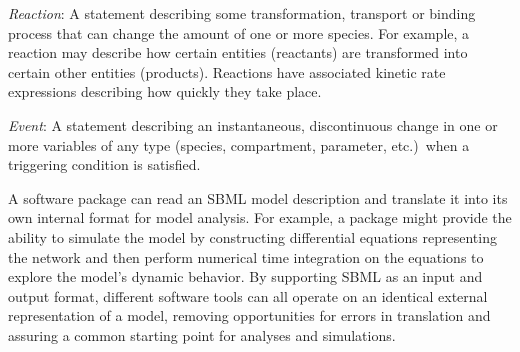 \begin{description}
\item \emph{Reaction}: A statement describing some transformation,
  transport or binding process that can change the amount of one
  or more species.  For example, a reaction may describe how
  certain entities (reactants) are transformed into certain other
  entities (products).  Reactions have associated kinetic rate
  expressions describing how quickly they take place.
  
\item \emph{Event}: A statement describing an instantaneous,
  discontinuous change in one or more variables of any type
  (species, compartment, parameter, etc.)\ when a triggering
  condition is satisfied.

\end{description}

A software package can read an SBML model description and
translate it into its own internal format for model analysis.  For
example, a package might provide the ability to simulate the model
by constructing differential equations representing the network
and then perform numerical time integration on the equations to
explore the model's dynamic behavior.  By supporting SBML as an
input and output format, different software tools can all operate
on an identical external representation of a model, removing
opportunities for errors in translation and assuring a common
starting point for analyses and simulations.
